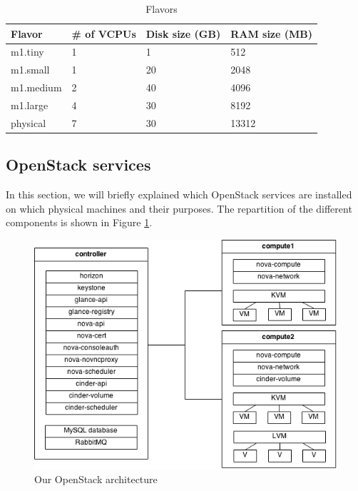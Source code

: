 \begin{table}[h]
	\centering
	\begin{tabular}{|l|l|l|l|}
		\hline
		\textbf{Flavor} & \textbf{\# of VCPUs} & \textbf{Disk size (GB)} & \textbf{RAM size (MB)}\\
		\hline
		m1.tiny & 1 & 1 & 512 \\
		m1.small & 1 & 20 & 2048 \\
		m1.medium & 2 & 40 & 4096 \\
		m1.large & 4 & 30 & 8192 \\
		physical & 7 & 30 & 13312 \\
		\hline
	\end{tabular}
	\caption{Flavors}
	\label{table:flavors_list_2}
\end{table}



\subsection{OpenStack services} %
In this section, we will briefly explained which OpenStack services are installed on which physical machines and their purposes. The repartition of the different components is shown in Figure \ref{fig:os_arch}.

\begin{figure}[h]
	\centering
	\includegraphics[scale=0.6]{figures/os_arch.png}
	\caption{Our OpenStack architecture}
	\label{fig:os_arch}
\end{figure}

